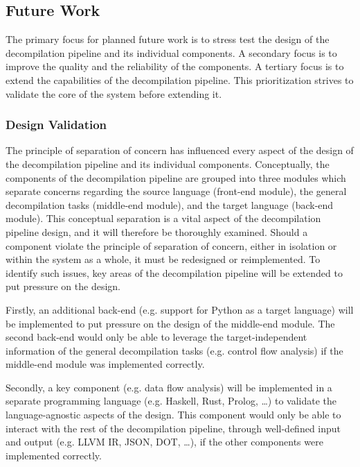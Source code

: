 
\subsection{Future Work}
\label{sec:future_work}

The primary focus for planned future work is to stress test the design of the decompilation pipeline and its individual components. A secondary focus is to improve the quality and the reliability of the components. A tertiary focus is to extend the capabilities of the decompilation pipeline. This prioritization strives to validate the core of the system before extending it.


\subsubsection{Design Validation}
\label{sec:design_validation}

The principle of separation of concern has influenced every aspect of the design of the decompilation pipeline and its individual components. Conceptually, the components of the decompilation pipeline are grouped into three modules which separate concerns regarding the source language (front-end module), the general decompilation tasks (middle-end module), and the target language (back-end module). This conceptual separation is a vital aspect of the decompilation pipeline design, and it will therefore be thoroughly examined. Should a component violate the principle of separation of concern, either in isolation or within the system as a whole, it must be redesigned or reimplemented. To identify such issues, key areas of the decompilation pipeline will be extended to put pressure on the design.

Firstly, an additional back-end (e.g. support for Python as a target language) will be implemented to put pressure on the design of the middle-end module. The second back-end would only be able to leverage the target-independent information of the general decompilation tasks (e.g. control flow analysis) if the middle-end module was implemented correctly.

Secondly, a key component (e.g. data flow analysis) will be implemented in a separate programming language (e.g. Haskell, Rust, Prolog, …) to validate the language-agnostic aspects of the design. This component would only be able to interact with the rest of the decompilation pipeline, through well-defined input and output (e.g. LLVM IR, JSON, DOT, …), if the other components were implemented correctly.

